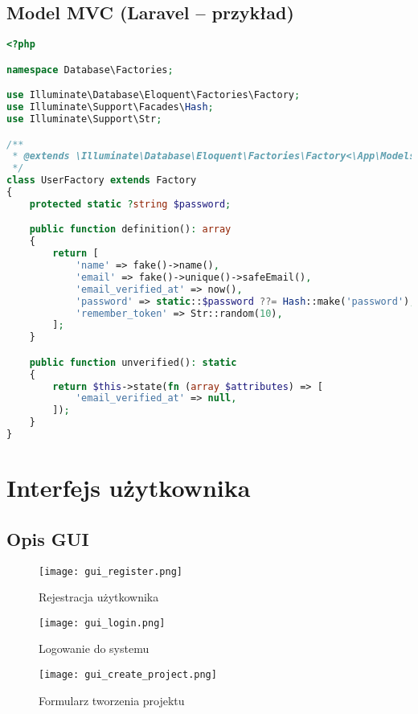 \documentclass[a4paper,12pt]{article}
\begin{document}
\subsection{Model MVC (Laravel – przykład)}

\begin{lstlisting}[language=PHP, caption=UserFactory.php]
<?php

namespace Database\Factories;

use Illuminate\Database\Eloquent\Factories\Factory;
use Illuminate\Support\Facades\Hash;
use Illuminate\Support\Str;

/**
 * @extends \Illuminate\Database\Eloquent\Factories\Factory<\App\Models\User>
 */
class UserFactory extends Factory
{
    protected static ?string $password;

    public function definition(): array
    {
        return [
            'name' => fake()->name(),
            'email' => fake()->unique()->safeEmail(),
            'email_verified_at' => now(),
            'password' => static::$password ??= Hash::make('password'),
            'remember_token' => Str::random(10),
        ];
    }

    public function unverified(): static
    {
        return $this->state(fn (array $attributes) => [
            'email_verified_at' => null,
        ]);
    }
}
\end{lstlisting}




\section{Interfejs użytkownika}

\subsection{Opis GUI}

\begin{figure}[h!]
\centering
\texttt{[image: gui\_register.png]}
\caption{Rejestracja użytkownika}
\end{figure}

\begin{figure}[h!]
\centering
\texttt{[image: gui\_login.png]}
\caption{Logowanie do systemu}
\end{figure}

\begin{figure}[h!]
\centering
\texttt{[image: gui\_create\_project.png]}
\caption{Formularz tworzenia projektu}
\end{figure}
\end{document}
